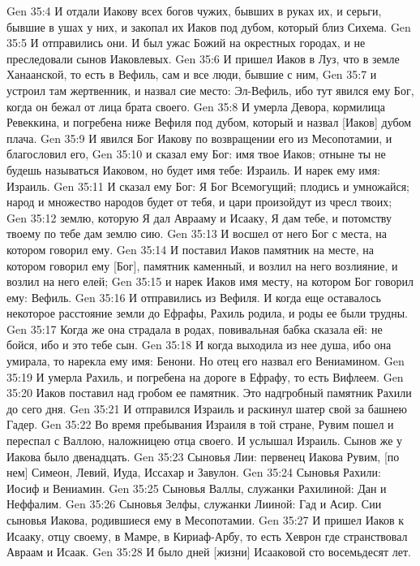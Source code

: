 Gen 35:4  И отдали Иакову всех богов чужих, бывших в руках их, и серьги, бывшие в ушах у них, и закопал их Иаков под дубом, который близ Сихема.
Gen 35:5  И отправились они. И был ужас Божий на окрестных городах, и не преследовали сынов Иаковлевых.
Gen 35:6  И пришел Иаков в Луз, что в земле Ханаанской, то есть в Вефиль, сам и все люди, бывшие с ним,
Gen 35:7  и устроил там жертвенник, и назвал сие место: Эл-Вефиль, ибо тут явился ему Бог, когда он бежал от лица брата своего.
Gen 35:8  И умерла Девора, кормилица Ревеккина, и погребена ниже Вефиля под дубом, который и назвал [Иаков] дубом плача.
Gen 35:9  И явился Бог Иакову по возвращении его из Месопотамии, и благословил его,
Gen 35:10  и сказал ему Бог: имя твое Иаков; отныне ты не будешь называться Иаковом, но будет имя тебе: Израиль. И нарек ему имя: Израиль.
Gen 35:11  И сказал ему Бог: Я Бог Всемогущий; плодись и умножайся; народ и множество народов будет от тебя, и цари произойдут из чресл твоих;
Gen 35:12  землю, которую Я дал Аврааму и Исааку, Я дам тебе, и потомству твоему по тебе дам землю сию.
Gen 35:13  И восшел от него Бог с места, на котором говорил ему.
Gen 35:14  И поставил Иаков памятник на месте, на котором говорил ему [Бог], памятник каменный, и возлил на него возлияние, и возлил на него елей;
Gen 35:15  и нарек Иаков имя месту, на котором Бог говорил ему: Вефиль.
Gen 35:16  И отправились из Вефиля. И когда еще оставалось некоторое расстояние земли до Ефрафы, Рахиль родила, и роды ее были трудны.
Gen 35:17  Когда же она страдала в родах, повивальная бабка сказала ей: не бойся, ибо и это тебе сын.
Gen 35:18  И когда выходила из нее душа, ибо она умирала, то нарекла ему имя: Бенони. Но отец его назвал его Вениамином.
Gen 35:19  И умерла Рахиль, и погребена на дороге в Ефрафу, то есть Вифлеем.
Gen 35:20  Иаков поставил над гробом ее памятник. Это надгробный памятник Рахили до сего дня.
Gen 35:21  И отправился Израиль и раскинул шатер свой за башнею Гадер.
Gen 35:22  Во время пребывания Израиля в той стране, Рувим пошел и переспал с Валлою, наложницею отца своего. И услышал Израиль. Сынов же у Иакова было двенадцать.
Gen 35:23  Сыновья Лии: первенец Иакова Рувим, [по нем] Симеон, Левий, Иуда, Иссахар и Завулон.
Gen 35:24  Сыновья Рахили: Иосиф и Вениамин.
Gen 35:25  Сыновья Валлы, служанки Рахилиной: Дан и Неффалим.
Gen 35:26  Сыновья Зелфы, служанки Лииной: Гад и Асир. Сии сыновья Иакова, родившиеся ему в Месопотамии.
Gen 35:27  И пришел Иаков к Исааку, отцу своему, в Мамре, в Кириаф-Арбу, то есть Хеврон где странствовал Авраам и Исаак.
Gen 35:28  И было дней [жизни] Исааковой сто восемьдесят лет.
